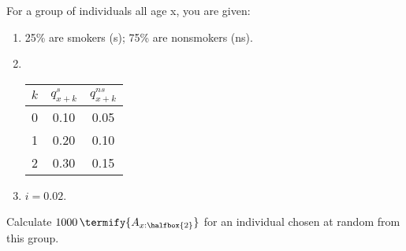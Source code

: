 For a group of individuals all age x, you are given:
\begin{enumerate}
\item 25\% are smokers (s); 75\% are nonsmokers (ns).
\item \  \begin{center}\begin{tabular}{ccc} $k$ & $q_{x+k}^{s}$ & $q_{x+k}^{ns}$ \\ \hline
        0 & 0.10 & 0.05 \\ 
        1  & 0.20 & 0.10 \\ 
        2 & 0.30 & 0.15 
\end{tabular}\end{center}
\item $i=0.02$.
\end{enumerate}
Calculate $1000\,\termify{A_{x:\halfbox{2}}}$ for an individual chosen at random from this group.

     

